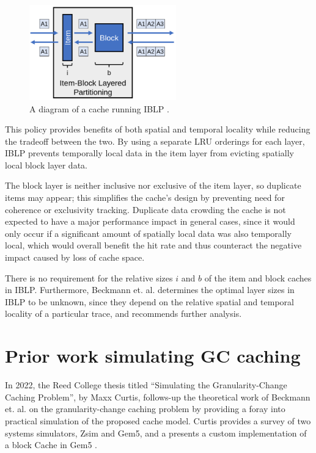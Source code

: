 \documentclass[12pt,twoside]{reedthesis}
\begin{document}
	\begin{figure}[h]
		\centering
		\includegraphics[width=2.5in]{figures/IBLP.png}
		\caption{A diagram of a cache running IBLP \cite{beckmann}.}
	\end{figure}

	This policy provides benefits of both spatial and temporal locality while reducing the tradeoff between the two. By using a separate LRU orderings for each layer, IBLP prevents temporally local data in the item layer from evicting spatially local block layer data.
	
	The block layer is neither inclusive nor exclusive of the item layer, so duplicate items may appear; this simplifies the cache's design by preventing need for coherence or exclusivity tracking. Duplicate data crowding the cache is not expected to have a major performance impact in general cases, since it would only occur if a significant amount of spatially local data was also temporally local, which would overall benefit the hit rate and thus counteract the negative impact caused by loss of cache space.
	
	There is no requirement for the relative sizes $i$ and $b$ of the item and block caches in IBLP. Furthermore, Beckmann et. al. determines the optimal layer sizes in IBLP to be unknown, since they depend on the relative spatial and temporal locality of a particular trace, and recommends further analysis.

\section{Prior work simulating GC caching}

In 2022, the Reed College thesis titled ``Simulating the Granularity-Change Caching Problem'', by Maxx Curtis, follows-up the theoretical work of Beckmann et. al. on the granularity-change caching problem by providing a foray into practical simulation of the proposed cache model. Curtis provides a survey of two systems simulators, Zsim and Gem5, and a presents a custom implementation of a block Cache in Gem5 \cite{curtis}.
\end{document}
